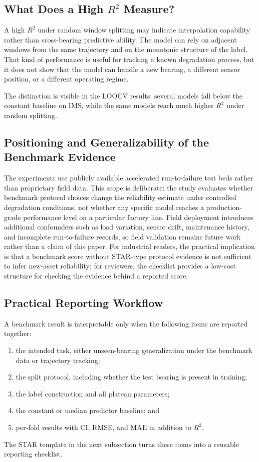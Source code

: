 \documentclass[pdflatex,sn-mathphys-num]{sn-jnl}
\begin{document}
\subsection{What Does a High $R^2$ Measure?}
A high $R^2$ under random window splitting may indicate interpolation capability rather than cross-bearing predictive ability. The model can rely on adjacent windows from the same trajectory and on the monotonic structure of the label. That kind of performance is useful for tracking a known degradation process, but it does not show that the model can handle a new bearing, a different sensor position, or a different operating regime.

The distinction is visible in the LOOCV results: several models fall below the constant baseline on IMS, while the same models reach much higher $R^2$ under random splitting.


\subsection{Positioning and Generalizability of the Benchmark Evidence}
The experiments use publicly available accelerated run-to-failure test beds rather than proprietary field data. This scope is deliberate: the study evaluates whether benchmark protocol choices change the reliability estimate under controlled degradation conditions, not whether any specific model reaches a production-grade performance level on a particular factory line. Field deployment introduces additional confounders such as load variation, sensor drift, maintenance history, and incomplete run-to-failure records, so field validation remains future work rather than a claim of this paper. For industrial readers, the practical implication is that a benchmark score without STAR-type protocol evidence is not sufficient to infer new-asset reliability; for reviewers, the checklist provides a low-cost structure for checking the evidence behind a reported score.

\subsection{Practical Reporting Workflow}
A benchmark result is interpretable only when the following items are reported together:
\begin{enumerate}
    \item the intended task, either unseen-bearing generalization under the benchmark data or trajectory tracking;
    \item the split protocol, including whether the test bearing is present in training;
    \item the label construction and all plateau parameters;
    \item the constant or median predictor baseline; and
    \item per-fold results with CI, RMSE, and MAE in addition to $R^2$.
\end{enumerate}
The STAR template in the next subsection turns these items into a reusable reporting checklist.
\end{document}
